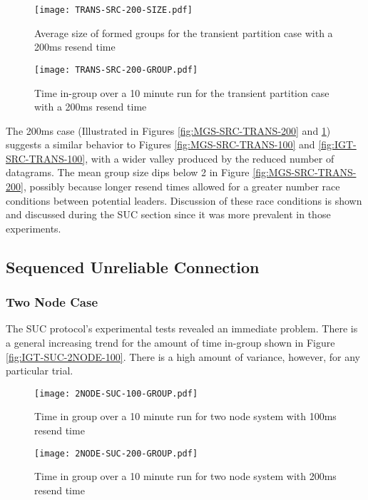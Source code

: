 \begin{figure}
\centering
\begin{minipage}{0.45\textwidth}
    \centering
    \texttt{[image: TRANS-SRC-200-SIZE.pdf]}
    \caption{Average size of formed groups for the transient partition case with a 200ms resend time}
    \label{fig:MGS-SRC-TRANS-200}
\end{minipage}%
\qquad
\begin{minipage}{0.45\textwidth}
    \centering
    \texttt{[image: TRANS-SRC-200-GROUP.pdf]}
    \caption{Time in-group over a 10 minute run for the transient partition case with a 200ms resend time}
    \label{fig:IGT-SRC-TRANS-200}
\end{minipage}
\end{figure}

The 200ms case (Illustrated in Figures \ref{fig:MGS-SRC-TRANS-200} and \ref{fig:IGT-SRC-TRANS-200}) suggests a similar behavior to Figures \ref{fig:MGS-SRC-TRANS-100} and \ref{fig:IGT-SRC-TRANS-100}, with a wider valley produced by the reduced number of datagrams.
The mean group size dips below 2 in Figure \ref{fig:MGS-SRC-TRANS-200}, possibly because longer resend times allowed for a greater number race conditions between potential leaders.
Discussion of these race conditions is shown and discussed during the SUC section since it was more prevalent in those experiments.

\subsection{Sequenced Unreliable Connection}

\subsubsection{Two Node Case}

The SUC protocol's experimental tests revealed an immediate problem.
There is a general increasing trend for the amount of time in-group shown in Figure \ref{fig:IGT-SUC-2NODE-100}.
There is a high amount of variance, however, for any particular trial.

\begin{figure}
\centering
\begin{minipage}{0.45\textwidth}
    \centering
    \texttt{[image: 2NODE-SUC-100-GROUP.pdf]}
    \caption{Time in group over a 10 minute run for two node system with 100ms resend time}
    \label{fig:IGT-SUC-2NODE-100}
\end{minipage}%
\qquad
\begin{minipage}{0.45\textwidth}
    \centering
    \texttt{[image: 2NODE-SUC-200-GROUP.pdf]}
    \caption{Time in group over a 10 minute run for two node system with 200ms resend time}
    \label{fig:IGT-SUC-2NODE-200}
\end{minipage}
\end{figure}

